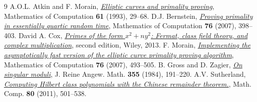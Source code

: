 \documentclass[11pt]{article}
\begin{document}
\vspace{-8pt}
\begin{thebibliography}{9}
 A.O.L. Atkin and F. Morain, \href{http://www.ams.org/journals/mcom/1993-61-203/S0025-5718-1993-1199989-X/}{\textit{Elliptic curves and primality proving}}, Mathematics of Computation \textbf{61} (1993), 29--68.
 D.J. Bernstein, \href{http://www.ams.org/journals/mcom/2007-76-257/S0025-5718-06-01786-8/}{\textit{Proving primality in essentially quartic random time}}, Mathematics of Computation \textbf{76} (2007), 398--403.
 David A. Cox, \href{http://onlinelibrary.wiley.com/book/10.1002/9781118400722}{\textit{Primes of the form $x^{2}+ny^{2}$: Fermat, class field theory, and complex multiplication}}, second edition, Wiley, 2013.
 F. Morain, \href{http://www.ams.org/journals/mcom/2007-76-257/S0025-5718-06-01890-4/}{\textit{Implementing the asymptotically fast version of the elliptic curve primality proving algorithm}}, Mathematics of Computation \textbf{76} (2007), 493--505.
 B. Gross and D. Zagier, \href{https://eudml.org/doc/152694}{\textit{On singular moduli}}, J. Reine Angew. Math. \textbf{355} (1984), 191--220.
 A.V. Sutherland, \href{https://doi.org/10.1090/S0025-5718-2010-02373-7}{\textit{Computing Hilbert class polynomials with the Chinese remainder theorem.}}, Math. Comp. \textbf{80} (2011), 501--538.
\end{thebibliography}
\end{document}
